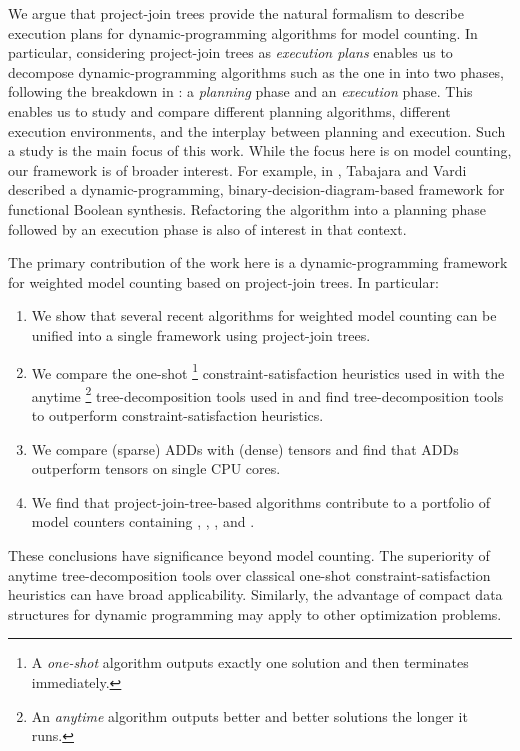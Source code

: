 We argue that project-join trees provide the natural formalism to describe execution plans for dynamic-programming algorithms for model counting.
In particular, considering project-join trees as \emph{execution plans} enables us to decompose dynamic-programming algorithms such as the one in \cite{dudek2020addmc} into two phases, following the breakdown in \cite{dudek2020parallel}: a \emph{planning} phase and an \emph{execution} phase.
This enables us to study and compare different planning algorithms, different execution environments, and the interplay between planning and execution.
Such a study is the main focus of this work.
While the focus here is on model counting, our framework is of broader interest.
For example, in \cite{tabajara2017factored}, Tabajara and Vardi described a dynamic-programming, binary-decision-diagram-based framework for functional Boolean synthesis.
Refactoring the algorithm into a planning phase followed by an execution phase is also of interest in that context.

The primary contribution of the work here is a dynamic-programming framework for weighted model counting based on project-join trees.
In particular:
\begin{enumerate}
    \item We show that several recent algorithms for weighted model counting \cite{dudek2020addmc,dudek2019efficient,fichte2020exploiting} can be unified into a single framework using project-join trees.
    \item We compare the one-shot%
    \footnote{A \emph{one-shot} algorithm outputs exactly one solution and then terminates immediately.}
    constraint-satisfaction heuristics used in \cite{dudek2020addmc} with the anytime%
    \footnote{An \emph{anytime} algorithm outputs better and better solutions the longer it runs.} tree-decomposition tools used in \cite{dudek2019efficient} and find     tree-decomposition tools to outperform
    constraint-satisfaction heuristics.
    \item We compare (sparse) ADDs \cite{bahar1997algebraic} with (dense) tensors \cite{kjolstad2017tensor} and find that ADDs outperform tensors on single CPU cores.
    \item We find that project-join-tree-based algorithms contribute to a portfolio of model counters containing \cachet{} \cite{sang2004combining}, \ctd{} \cite{darwiche2004new}, \df{} \cite{lagniez2017improved}, and \minictd{} \cite{oztok2015top}.
\end{enumerate}
These conclusions have significance beyond model counting.
The superiority of anytime tree-decomposition tools over classical one-shot constraint-satisfaction heuristics can have broad applicability.
Similarly, the advantage of compact data structures for dynamic programming may apply to other optimization problems.

